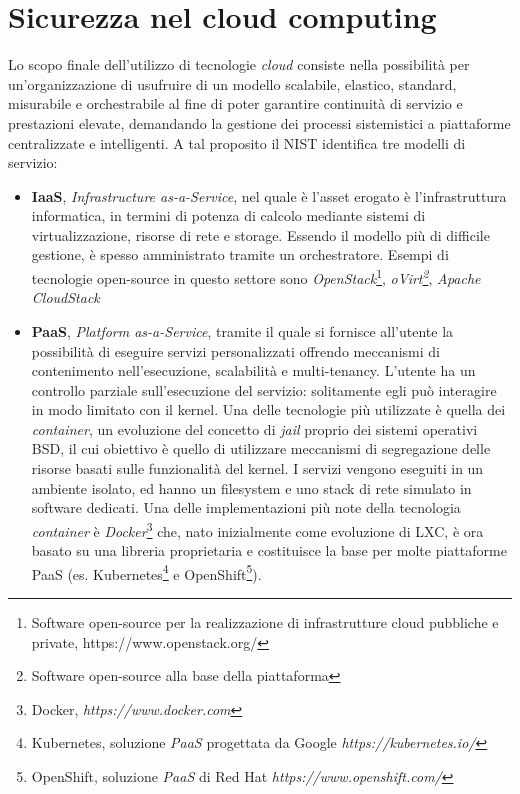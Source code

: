 \documentclass[../main.tex]{subfiles}
\begin{document}
\section{Sicurezza nel cloud computing}
Lo scopo finale dell'utilizzo di tecnologie \textit{cloud} consiste nella possibilità per un'organizzazione di usufruire di un modello scalabile, elastico, standard, misurabile e orchestrabile al fine di poter garantire continuità di servizio e prestazioni elevate, demandando la gestione dei processi sistemistici a piattaforme centralizzate e intelligenti.
A tal proposito il NIST \cite{NISTCloud} identifica tre modelli di servizio:
\begin{itemize}
    \item \textbf{IaaS}, \textit{Infrastructure as-a-Service}, nel quale è l'asset erogato è l'infrastruttura informatica, in termini di potenza di calcolo mediante sistemi di virtualizzazione, risorse di rete e storage. Essendo il modello più di difficile gestione, è spesso amministrato tramite un orchestratore. Esempi di tecnologie open-source in questo settore sono \textit{OpenStack}\footnote{Software open-source per la realizzazione di infrastrutture cloud pubbliche e private, https://www.openstack.org/}, \textit{oVirt\footnote{Software open-source alla base della piattaforma }}, \textit{Apache CloudStack}
    \item \textbf{PaaS}, \textit{Platform as-a-Service}, tramite il quale si fornisce all'utente la possibilità di eseguire servizi personalizzati offrendo meccanismi di contenimento nell'esecuzione, scalabilità e multi-tenancy. L'utente ha un controllo parziale sull'esecuzione del servizio: solitamente egli può interagire in modo limitato con il kernel. Una delle tecnologie più utilizzate è quella dei \textit{container}, un evoluzione del concetto di \textit{jail} proprio dei sistemi operativi BSD, il cui obiettivo è quello di utilizzare meccanismi di segregazione delle risorse basati sulle funzionalità del kernel. I servizi vengono eseguiti in un ambiente isolato, ed hanno un filesystem e uno stack di rete simulato in software dedicati. Una delle implementazioni più note della tecnologia \textit{container} è \textit{Docker}\footnote{Docker, \textit{https://www.docker.com}} che, nato inizialmente come evoluzione di LXC, è ora basato su una libreria proprietaria e costituisce la base per molte piattaforme PaaS (es. Kubernetes\footnote{Kubernetes, soluzione \textit{PaaS} progettata da Google \textit{https://kubernetes.io/}} e OpenShift\footnote{OpenShift, soluzione \textit{PaaS} di Red Hat \textit{https://www.openshift.com/}}). 

\end{itemize}
\end{document}
